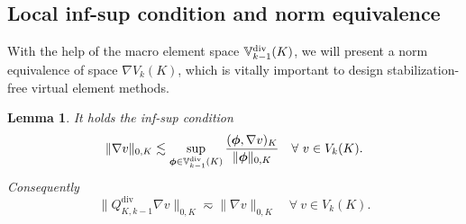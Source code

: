 \documentclass[10pt]{amsart}
\newtheorem{lemma}[theorem]{Lemma}
\renewcommand{\div}{\operatorname{div}}
\numberwithin{equation}{section}
\begin{document}
\subsection{Local inf-sup condition and norm equivalence}
With the help of the macro element space $\mathbb{V}_{k-1}^{\rm div}(K)$, we will present a norm equivalence of space $\nabla V_k(K)$, which is vitally important to design stabilization-free virtual element methods. 
\begin{lemma}\label{lem:gradVknormequivalence}
It holds the inf-sup condition
\begin{equation}\label{eq:localdiscreteinfsup}    
\|\nabla v\|_{0,K}\lesssim \sup_{\boldsymbol{\phi}\in\mathbb{V}_{k-1}^{\rm div}(K)}\frac{(\boldsymbol{\phi}, \nabla v)_K}{\|\boldsymbol{\phi}\|_{0,K}} \quad \forall~v\in V_k(K).
\end{equation}
Consequently
\begin{equation}\label{eq:gradVknormequivalence}  
\|Q_{K,k-1}^{\div}\nabla v\|_{0,K}\eqsim \|\nabla v\|_{0,K} \quad \forall~v\in V_k(K).
\end{equation}
\end{lemma}
\end{document}

